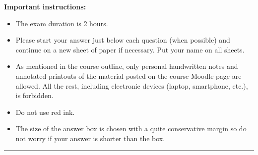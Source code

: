{\noindent \textbf{Important instructions:}}
\begin{itemize}
\itemsep0em
\item The exam duration is 2 hours.
\item Please start your answer just below each question (when possible) and continue on a new sheet of paper if necessary. Put your name on all sheets.
\item As mentioned in the course outline, only personal handwritten notes and annotated printouts of the material posted on the course Moodle page are allowed. All the rest, including electronic devices (laptop, smartphone, etc.), is forbidden.
\item Do not use red ink.
\item The size of the answer box is chosen with a quite conservative margin so do not worry if your answer is shorter than the box.
\end{itemize}

\hrule
\clearpage
